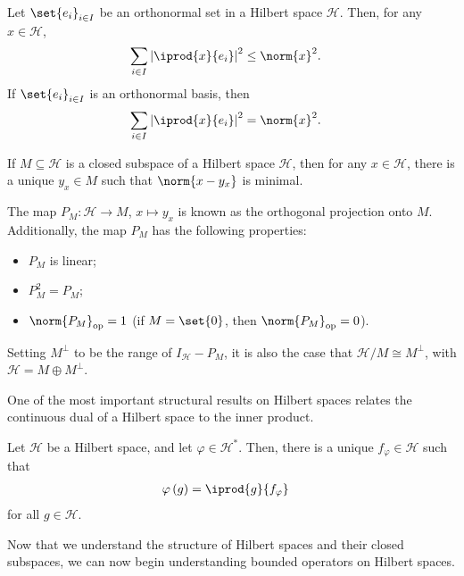 \begin{theorem}
  Let $\set{e_i}_{i\in I}$ be an orthonormal set in a Hilbert space $\mathcal{H}$. Then, for any $x\in \mathcal{H}$,
  \begin{align*}
    \sum_{i\in I} \left\vert \iprod{x}{e_i} \right\vert^2 &\leq \norm{x}^2.
  \end{align*}
  If $\set{e_i}_{i\in I}$ is an orthonormal basis, then
  \begin{align*}
    \sum_{i\in I} \left\vert \iprod{x}{e_i} \right\vert^2 &= \norm{x}^2.
  \end{align*}
\end{theorem}
\begin{theorem}\label{thm:projection_theorem}
  If $M\subseteq \mathcal{H}$ is a closed subspace of a Hilbert space $\mathcal{H}$, then for any $x\in \mathcal{H}$, there is a unique $y_x\in M$ such that $\norm{x-y_x}$ is minimal.\newline

  The map $P_M\colon \mathcal{H}\rightarrow M$, $x\mapsto y_x$ is known as the orthogonal projection onto $M$. Additionally, the map $P_M$ has the following properties:
  \begin{itemize}
    \item $P_M$ is linear;
    \item $P_M^2 = P_M$;
    \item $\norm{P_M}_{\op} = 1$ (if $M = \set{0}$, then $\norm{P_M}_{\op} = 0$).
  \end{itemize}
  Setting $M^{\perp}$ to be the range of $I_{\mathcal{H}} - P_M$, it is also the case that $\mathcal{H}/M \cong M^{\perp}$, with $\mathcal{H} = M\oplus M^{\perp}$.
\end{theorem}
One of the most important structural results on Hilbert spaces relates the continuous dual of a Hilbert space to the inner product. 
\begin{theorem}
  Let $\mathcal{H}$ be a Hilbert space, and let $\varphi\in \mathcal{H}^{\ast}$. Then, there is a unique $f_{\varphi}\in \mathcal{H}$ such that
  \begin{align*}
    \varphi\left(g\right) &= \iprod{g}{f_{\varphi}}
  \end{align*}
  for all $g\in \mathcal{H}$.
\end{theorem}
Now that we understand the structure of Hilbert spaces and their closed subspaces, we can now begin understanding bounded operators on Hilbert spaces.
